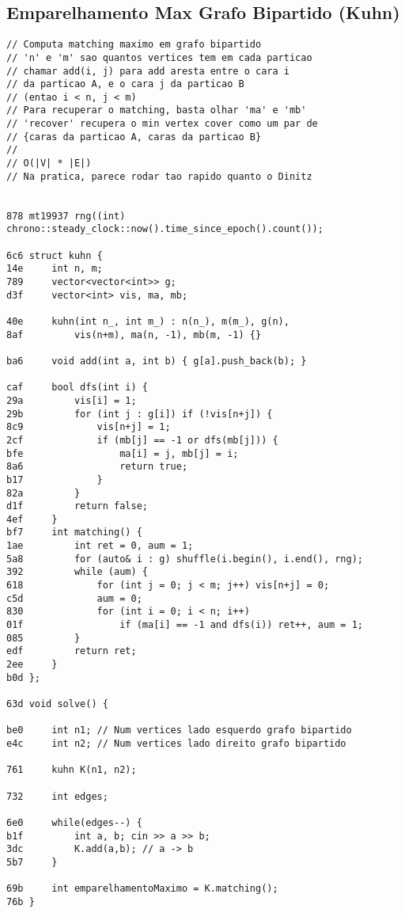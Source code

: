 \documentclass[11pt, a4paper, twoside]{article}
\begin{document}
\subsection{Emparelhamento Max Grafo Bipartido (Kuhn)}
\begin{lstlisting}
// Computa matching maximo em grafo bipartido
// 'n' e 'm' sao quantos vertices tem em cada particao
// chamar add(i, j) para add aresta entre o cara i
// da particao A, e o cara j da particao B
// (entao i < n, j < m)
// Para recuperar o matching, basta olhar 'ma' e 'mb'
// 'recover' recupera o min vertex cover como um par de
// {caras da particao A, caras da particao B}
//
// O(|V| * |E|)
// Na pratica, parece rodar tao rapido quanto o Dinitz


878 mt19937 rng((int) chrono::steady_clock::now().time_since_epoch().count());

6c6 struct kuhn {
14e 	int n, m;
789 	vector<vector<int>> g;
d3f 	vector<int> vis, ma, mb;
    
40e 	kuhn(int n_, int m_) : n(n_), m(m_), g(n),
8af 		vis(n+m), ma(n, -1), mb(m, -1) {}
    
ba6 	void add(int a, int b) { g[a].push_back(b); }
    
caf 	bool dfs(int i) {
29a 		vis[i] = 1;
29b 		for (int j : g[i]) if (!vis[n+j]) {
8c9 			vis[n+j] = 1;
2cf 			if (mb[j] == -1 or dfs(mb[j])) {
bfe 				ma[i] = j, mb[j] = i;
8a6 				return true;
b17 			}
82a 		}
d1f 		return false;
4ef 	}
bf7 	int matching() {
1ae 		int ret = 0, aum = 1;
5a8 		for (auto& i : g) shuffle(i.begin(), i.end(), rng);
392 		while (aum) {
618 			for (int j = 0; j < m; j++) vis[n+j] = 0;
c5d 			aum = 0;
830 			for (int i = 0; i < n; i++)
01f 				if (ma[i] == -1 and dfs(i)) ret++, aum = 1;
085 		}
edf 		return ret;
2ee 	}
b0d };

63d void solve() {
    
be0 	int n1; // Num vertices lado esquerdo grafo bipartido
e4c 	int n2; // Num vertices lado direito grafo bipartido
    	
761 	kuhn K(n1, n2);
    
732 	int edges;
    
6e0 	while(edges--) {
b1f 		int a, b; cin >> a >> b;
3dc 		K.add(a,b); // a -> b
5b7 	}
    
69b 	int emparelhamentoMaximo = K.matching();
76b }
\end{lstlisting}
\end{document}
